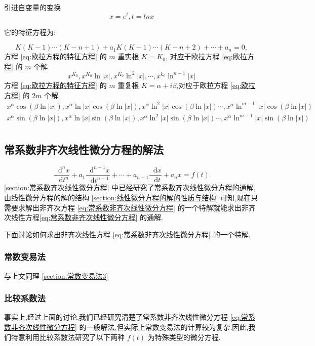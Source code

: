 \documentclass{ctexart}
\newcommand*{\dif}{\mathop{}\!\mathrm{d}}
\numberwithin{equation}{subsection}
\begin{document}
\textcolor[rgb]{1,0,0}{引进自变量的变换\[ x=e^t,t=lnx \]} 


它的特征方程为:

\begin{equation}
        \label{eq:欧拉方程的特征方程}
        K(K-1)\cdots(K-n+1)+a_1K(K-1)\cdots(K-n+2)+\cdots+a_n=0,
\end{equation}
方程 \eqref{eq:欧拉方程的特征方程} 的 $m$ 重实根 $K=K_0$, 对应于欧拉方程 \eqref{eq:欧拉方程} 的 $m$ 个解
\[x^{K_0},x^{K_0}\ln|x|,x^{K_0}\ln^2|x|,\cdots,x^{k_0}\ln^{n-1}|x|\]
方程 \eqref{eq:欧拉方程的特征方程} 的 $m$ 重复根 $K=\alpha+i\beta$,对应于欧拉方程 \eqref{eq:欧拉方程} 的 $2m$ 个解
\begin{align*}
        x^\alpha\cos(\beta\ln|x|),x^\alpha\ln|x|\cos(\beta\ln|x|),x^\alpha\ln^2|x|\cos(\beta\ln|x|)\cdots,x^{\alpha}\ln^{m-1}|x|\cos(\beta\ln|x|)\\
        x^\alpha\sin(\beta\ln|x|),x^\alpha\ln|x|\sin(\beta\ln|x|),x^\alpha\ln^2|x|\sin(\beta\ln|x|)\cdots,x^{\alpha}\ln^{m-1}|x|\sin(\beta\ln|x|)\\
\end{align*}

\subsection{常系数非齐次线性微分方程的解法}
\begin{equation}
        \label{eq:常系数非齐次线性微分方程}
        \frac{\dif^nx}{\dif t^n}+a_1\frac{\dif^{n-1}x}{\dif t^{n-1}}+\cdots+a_{n-1}\frac{\dif x}{\dif t}+a_nx=f(t)
\end{equation}
\ref{section:常系数齐次线性微分方程} 中已经研究了常系数齐次线性微分方程的通解,由线性微分方程的解的结构 \ref{section:线性微分方程的解的性质与结构} 可知,现在只需要求解出非齐次方程 \eqref{eq:常系数非齐次线性微分方程} 的一个特解就能求出非齐次线性方程\eqref{eq:常系数非齐次线性微分方程} 的通解.

下面讨论如何求出非齐次线性方程 \eqref{eq:常系数非齐次线性微分方程} 的一个特解.
\subsubsection{常数变易法}
与上文同理 \ref{section:常数变易法3}
\subsubsection{\textcolor[rgb]{1,0,0}{比较系数法}}

事实上,经过上面的讨论,我们已经研究清楚了常系数非齐次线性微分方程 \eqref{eq:常系数非齐次线性微分方程} 的一般解法,但实际上常数变易法的计算较为复杂.因此,我们特意利用比较系数法研究了以下两种 $f(t)$ 为特殊类型的微分方程.
\end{document}
